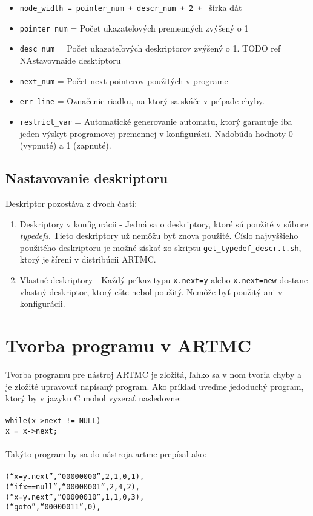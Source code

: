 \begin{itemize}
\item \texttt{node\_width = pointer\_num + descr\_num + 2 + } šírka dát  
\item \texttt{pointer\_num} = Počet ukazateľových premenných zvýšený o 1
\item \texttt{desc\_num} = Počet ukazateľových deskriptorov zvýšený o 1. TODO ref NAstavovnaide desktiptoru
\item \texttt{next\_num} = Počet next pointerov použitých v programe
\item \texttt{err\_line} = Označenie riadku, na ktorý sa skáče v prípade chyby.
\item \texttt{restrict\_var} = Automatické generovanie automatu, ktorý garantuje iba jeden výskyt programovej premennej v konfigurácii. Nadobúda hodnoty 0 (vypnuté) a 1 (zapnuté).
\end{itemize}


\subsection{Nastavovanie deskriptoru}
Deskriptor pozostáva z dvoch častí:
\begin{enumerate}
\item Deskriptory v konfigurácii - Jedná sa o deskriptory, ktoré sú použité v súbore \textit{typedefs}. Tieto deskriptory už nemôžu byť znova použité. Číslo najvyššieho použitého deskriptoru je možné získať zo skriptu \texttt{get\_typedef\_descr.t.sh}, ktorý je šírení v distribúcii ARTMC.
\item Vlastné deskriptory - Každý príkaz typu \texttt{x.next=y} alebo \texttt{x.next=new} dostane vlastný deskriptor, ktorý ešte nebol použitý. Nemôže byť použitý ani v konfigurácii.
\end{enumerate}

\section{Tvorba programu v ARTMC}
Tvorba programu pre nástroj ARTMC je zložitá, ľahko sa v nom tvoria chyby a je zložité
upravovať napísaný program.
Ako príklad uveďme jedoduchý program, ktorý by v jazyku C mohol vyzerať nasledovne:\\
\noindent
\texttt{
\\
while(x->next != NULL)\\
\tab x = x->next;
\\
}
\\
\noindent
Takýto program by sa do nástroja artmc prepísal ako:\\
\texttt{ 
\\
\tab (``x=y.next'',``00000000'',2,1,0,1),\\
\tab (``ifx==null'',``00000001'',2,4,2),\\
\tab (``x=y.next'',``00000010'',1,1,0,3),\\
\tab (``goto'',``00000011'',0),\\
}

